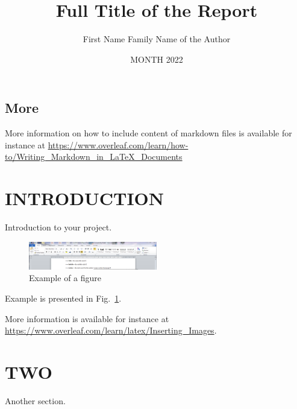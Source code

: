 \documentclass{reportOpenlab} %
\begin{document}
\title{Full Title of the Report}
\author{First Name Family Name of the Author}
\date{MONTH 2022}

\maketitlepage



\tableofcontents



\subsection{More}

More information on how to include content of markdown files is available for instance at \url{https://www.overleaf.com/learn/how-to/Writing_Markdown_in_LaTeX_Documents}

\section{INTRODUCTION}
Introduction to your project.

\begin{figure}[h]
\centering
\includegraphics[width=0.5\textwidth]{assets/example.png}
\caption{Example of a figure~\cite{exampleCitation}}
\label{fig:example}
\end{figure}

Example is presented in Fig.~\ref{fig:example}.

More information is available for instance at \url{https://www.overleaf.com/learn/latex/Inserting_Images}.

\section{TWO}
Another section.
\end{document}
